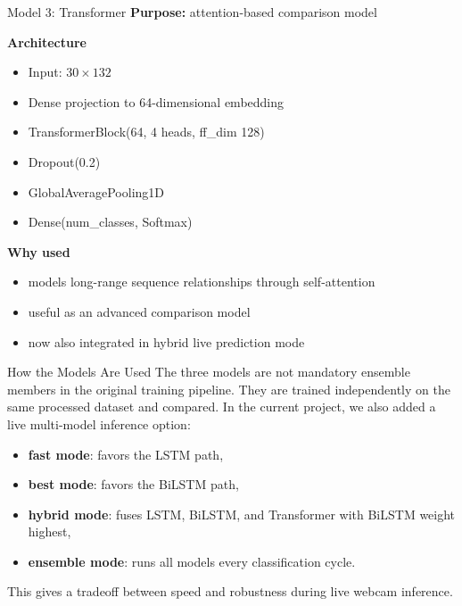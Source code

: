 \documentclass[aspectratio=169]{beamer}
\begin{document}
\begin{frame}{Model 3: Transformer}
\small
\textbf{Purpose:} attention-based comparison model

\vspace{0.2cm}
\textbf{Architecture}
\begin{itemize}
  \item Input: \(30 \times 132\)
  \item Dense projection to 64-dimensional embedding
  \item TransformerBlock(64, 4 heads, ff\_dim 128)
  \item Dropout(0.2)
  \item GlobalAveragePooling1D
  \item Dense(num\_classes, Softmax)
\end{itemize}

\vspace{0.2cm}
\textbf{Why used}
\begin{itemize}
  \item models long-range sequence relationships through self-attention
  \item useful as an advanced comparison model
  \item now also integrated in hybrid live prediction mode
\end{itemize}
\end{frame}

\begin{frame}{How the Models Are Used}
\justifying
The three models are not mandatory ensemble members in the original training pipeline. They are trained independently on the same processed dataset and compared. In the current project, we also added a live multi-model inference option:

\begin{itemize}
  \item \textbf{fast mode}: favors the LSTM path,
  \item \textbf{best mode}: favors the BiLSTM path,
  \item \textbf{hybrid mode}: fuses LSTM, BiLSTM, and Transformer with BiLSTM weight highest,
  \item \textbf{ensemble mode}: runs all models every classification cycle.
\end{itemize}

This gives a tradeoff between speed and robustness during live webcam inference.
\end{frame}
\end{document}
